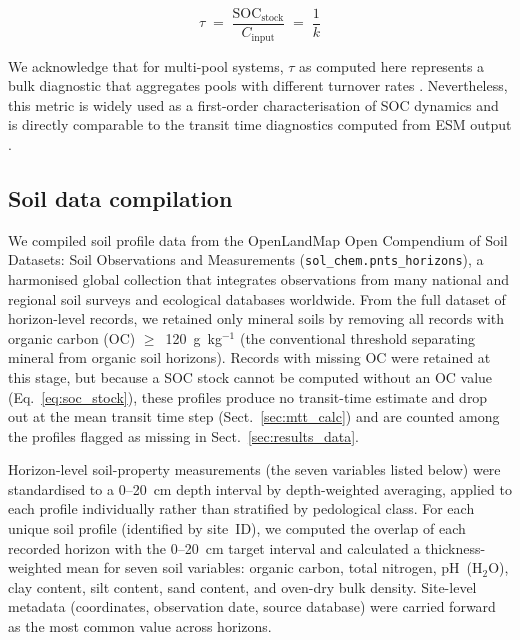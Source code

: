 \documentclass[12pt, a4paper]{article}
\begin{document}
\begin{equation}
  \tau \;=\; \frac{\text{SOC}_\text{stock}}{C_\text{input}}
  \;=\; \frac{1}{k}
  \label{eq:mtt}
\end{equation}

\noindent
We acknowledge that for multi-pool systems, $\tau$ as computed here
represents a bulk diagnostic that aggregates pools with different
turnover rates \citep{Sierra2018}. Nevertheless, this metric is widely
used as a first-order characterisation of SOC dynamics and is directly
comparable to the transit time diagnostics computed from ESM output
\citep{Carvalhais2014,Sierra2017}.


\subsection{Soil data compilation}
\label{sec:data}

We compiled soil profile data from the OpenLandMap Open Compendium
of Soil Datasets: Soil Observations and Measurements
\citep{OpenLandMapSoilDB2025} (\texttt{sol\_chem.pnts\_horizons}), a
harmonised global collection that integrates observations from many
national and regional soil surveys and ecological databases worldwide. From the full
dataset of horizon-level records, we retained only mineral soils by
removing all records with organic carbon (OC)
$\geq$~120~g~kg$^{-1}$ (the conventional threshold separating mineral
from organic soil horizons). Records with missing OC were retained at
this stage, but because a SOC stock cannot be computed without an OC
value (Eq.~\ref{eq:soc_stock}), these profiles produce no transit-time
estimate and drop out at the mean transit time step
(Sect.~\ref{sec:mtt_calc}) and are counted among the profiles flagged
as missing in Sect.~\ref{sec:results_data}.

Horizon-level soil-property measurements (the seven variables listed below)
were standardised to a 0--20~cm depth interval by
depth-weighted averaging, applied to each profile individually rather than
stratified by pedological class. For each unique soil profile (identified by
site~ID), we computed the overlap of each recorded horizon with the
0--20~cm target interval and calculated a thickness-weighted mean for
seven soil variables: organic carbon, total nitrogen, pH~(H$_2$O), clay
content, silt content, sand content, and oven-dry bulk density.
Site-level metadata (coordinates, observation date, source database)
were carried forward as the most common value across horizons.
\end{document}
